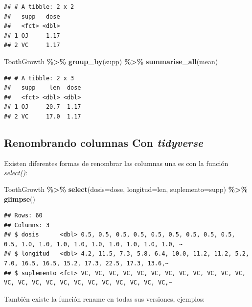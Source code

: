 \documentclass[
]{book}
\newenvironment{Shaded}{\begin{snugshade}}{\end{snugshade}}
\newcommand{\AttributeTok}[1]{\textcolor[rgb]{0.13,0.29,0.53}{#1}}
\newcommand{\FunctionTok}[1]{\textcolor[rgb]{0.13,0.29,0.53}{\textbf{#1}}}
\newcommand{\NormalTok}[1]{#1}
\newcommand{\SpecialCharTok}[1]{\textcolor[rgb]{0.81,0.36,0.00}{\textbf{#1}}}
\begin{document}
\begin{verbatim}
## # A tibble: 2 x 2
##   supp   dose
##   <fct> <dbl>
## 1 OJ     1.17
## 2 VC     1.17
\end{verbatim}

\begin{Shaded}
\begin{Highlighting}[]
\NormalTok{ToothGrowth }\SpecialCharTok{\%\textgreater{}\%}  \FunctionTok{group\_by}\NormalTok{(supp) }\SpecialCharTok{\%\textgreater{}\%}  \FunctionTok{summarise\_all}\NormalTok{(mean)}
\end{Highlighting}
\end{Shaded}

\begin{verbatim}
## # A tibble: 2 x 3
##   supp    len  dose
##   <fct> <dbl> <dbl>
## 1 OJ     20.7  1.17
## 2 VC     17.0  1.17
\end{verbatim}

\hfill\break

\subsection{\texorpdfstring{Renombrando columnas Con \emph{tidyverse}}{Renombrando columnas Con tidyverse}}\label{renombrando-columnas-con-tidyverse}

Existen diferentes formas de renombrar las columnas una es con la función \emph{select()}:

\begin{Shaded}
\begin{Highlighting}[]
\NormalTok{ToothGrowth }\SpecialCharTok{\%\textgreater{}\%} \FunctionTok{select}\NormalTok{(}\AttributeTok{dosis=}\NormalTok{dose, }\AttributeTok{longitud=}\NormalTok{len, }\AttributeTok{suplemento=}\NormalTok{supp) }\SpecialCharTok{\%\textgreater{}\%} \FunctionTok{glimpse}\NormalTok{()}
\end{Highlighting}
\end{Shaded}

\begin{verbatim}
## Rows: 60
## Columns: 3
## $ dosis      <dbl> 0.5, 0.5, 0.5, 0.5, 0.5, 0.5, 0.5, 0.5, 0.5, 0.5, 1.0, 1.0, 1.0, 1.0, 1.0, 1.0, 1.0, 1.0, 1.0, ~
## $ longitud   <dbl> 4.2, 11.5, 7.3, 5.8, 6.4, 10.0, 11.2, 11.2, 5.2, 7.0, 16.5, 16.5, 15.2, 17.3, 22.5, 17.3, 13.6,~
## $ suplemento <fct> VC, VC, VC, VC, VC, VC, VC, VC, VC, VC, VC, VC, VC, VC, VC, VC, VC, VC, VC, VC, VC, VC, VC, VC,~
\end{verbatim}

\hfill\break
También existe la función rename en todas sus versiones, ejemplos:
\end{document}
